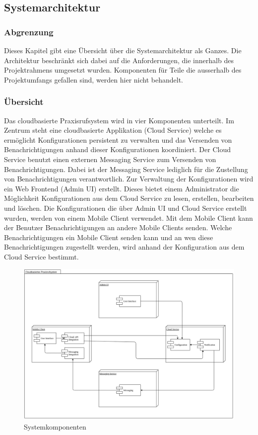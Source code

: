 \subsection{Systemarchitektur}\label{subsec:systemarchitektur}
\subsubsection*{Abgrenzung}

Dieses Kapitel gibt eine Übersicht über die Systemarchitektur als Ganzes.
Die Architektur beschränkt sich dabei auf die Anforderungen, die innerhalb des Projektrahmens umgesetzt wurden.
Komponenten für Teile die ausserhalb des Projektumfangs gefallen sind, werden hier nicht behandelt.

\subsubsection*{Übersicht}

Das cloudbasierte Praxisrufsystem wird in vier Komponenten unterteilt.
Im Zentrum steht eine cloudbasierte Applikation (Cloud Service) welche es ermöglicht Konfigurationen persistent zu verwalten und das Versenden von Benachrichtigungen anhand dieser Konfigurationen koordiniert.
Der Cloud Service benutzt einen externen Messaging Service zum Versenden von Benachrichtigungen.
Dabei ist der Messaging Service lediglich für die Zustellung von Benachrichtigungen verantwortlich.
Zur Verwaltung der Konfigurationen wird ein Web Frontend (Admin UI) erstellt.
Dieses bietet einem Administrator die Möglichkeit Konfigurationen aus dem Cloud Service zu lesen, erstellen, bearbeiten und löschen.
Die Konfigurationen die über Admin UI und Cloud Service erstellt wurden, werden von einem Mobile Client verwendet.
Mit dem Mobile Client kann der Benutzer Benachrichtigungen an andere Mobile Clients senden.
Welche Benachrichtigungen ein Mobile Client senden kann und an wen diese Benachrichtigungen zugestellt werden, wird anhand der Konfiguration aus dem Cloud Service bestimmt.

\begin{figure}[h]
    \centering
    \begin{minipage}[b]{1.0\textwidth}
        \includegraphics[width=\textwidth]{graphics/Component_System}
        \caption{Systemkomponenten}
    \end{minipage}
\end{figure}

\clearpage
